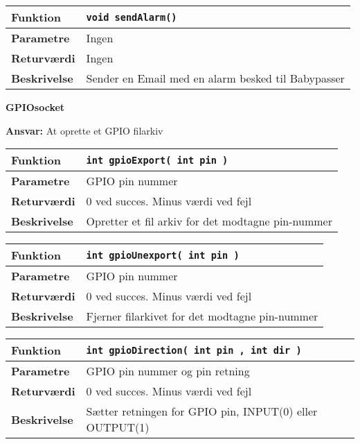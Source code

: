 \begin{center}
    \begin{tabular}{ | l | p{} |}
    \hline
    \textbf{Funktion}	& \verb+void sendAlarm() +									\\ \hline
    \textbf{Parametre} 	& Ingen														\\ \hline
    \textbf{Returværdi}	& Ingen 														\\ \hline
    \textbf{Beskrivelse}	& Sender en Email med en alarm besked til Babypasser		\\ \hline
    \end{tabular}
\end{center}


{\centering
\textbf{GPIOsocket}\par
}
\textbf{Ansvar:} At oprette et GPIO filarkiv \

\begin{center}
    \begin{tabular}{ | l | p{} |}
    \hline
    \textbf{Funktion}	& \verb+int gpioExport( int pin ) +						\\ \hline
    \textbf{Parametre} 	& GPIO pin nummer										\\ \hline
    \textbf{Returværdi}	& 0 ved succes. Minus værdi ved fejl 					\\ \hline
    \textbf{Beskrivelse}	& Opretter et fil arkiv for det modtagne pin-nummer		\\ \hline
    \end{tabular}
\end{center}

\begin{center}
    \begin{tabular}{ | l | p{} |}
    \hline
    \textbf{Funktion}	& \verb+int gpioUnexport( int pin ) +					\\ \hline
    \textbf{Parametre} 	& GPIO pin nummer										\\ \hline
    \textbf{Returværdi}	& 0 ved succes. Minus værdi ved fejl 					\\ \hline
    \textbf{Beskrivelse}	& Fjerner filarkivet for det modtagne pin-nummer			\\ \hline
    \end{tabular}
\end{center}

\begin{center}
    \begin{tabular}{ | l | p{} |}
    \hline
    \textbf{Funktion}	& \verb+int gpioDirection( int pin , int dir ) +					\\ \hline
    \textbf{Parametre} 	& GPIO pin nummer og pin retning									\\ \hline
    \textbf{Returværdi}	& 0 ved succes. Minus værdi ved fejl								\\ \hline
    \textbf{Beskrivelse}	& Sætter retningen for GPIO pin, INPUT(0) eller OUTPUT(1)			\\ \hline
    \end{tabular}
\end{center}



